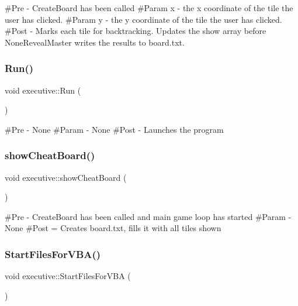 \#\+Pre -\/ Create\+Board has been called \#\+Param x -\/ the x coordinate of the tile the user has clicked. \#\+Param y -\/ the y coordinate of the tile the user has clicked. \#\+Post -\/ Marks each tile for backtracking. Updates the show array before None\+Reveal\+Master writes the results to board.\+txt. \mbox{\label{classexecutive_a979d10f76a13e75a3d003fcbd7d224ad}} 
\subsubsection{\texorpdfstring{Run()}{Run()}}
{\footnotesize\ttfamily void executive\+::\+Run (\begin{DoxyParamCaption}{ }\end{DoxyParamCaption})}

\#\+Pre -\/ None \#\+Param -\/ None \#\+Post -\/ Launches the program \mbox{\label{classexecutive_ad9c53131ff9fcb088ae6a46bb2874d90}} 
\subsubsection{\texorpdfstring{showCheatBoard()}{showCheatBoard()}}
{\footnotesize\ttfamily void executive\+::show\+Cheat\+Board (\begin{DoxyParamCaption}{ }\end{DoxyParamCaption})}

\#\+Pre -\/ Create\+Board has been called and main game loop has started \#\+Param -\/ None \#\+Post = Creates board.\+txt, fills it with all tiles shown \mbox{\label{classexecutive_a29514ae2f55a8f5f951566d1520ed5d8}} 
\subsubsection{\texorpdfstring{StartFilesForVBA()}{StartFilesForVBA()}}
{\footnotesize\ttfamily void executive\+::\+Start\+Files\+For\+V\+BA (\begin{DoxyParamCaption}{ }\end{DoxyParamCaption})}

